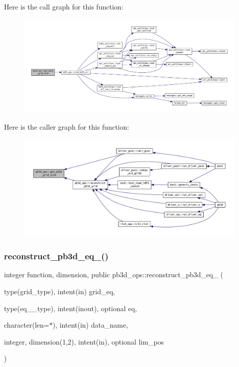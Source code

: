 Here is the call graph for this function\+:
\nopagebreak
\begin{figure}[H]
\begin{center}
\leavevmode
\includegraphics[width=350pt]{namespacepb3d__ops_a0bd4c4c24d7cbd1494b31ea993946433_cgraph}
\end{center}
\end{figure}
Here is the caller graph for this function\+:
\nopagebreak
\begin{figure}[H]
\begin{center}
\leavevmode
\includegraphics[width=350pt]{namespacepb3d__ops_a0bd4c4c24d7cbd1494b31ea993946433_icgraph}
\end{center}
\end{figure}
\mbox{\label{namespacepb3d__ops_a248d51dc98b7de287499ba3a4e6c1eaa}} 
\subsubsection{\texorpdfstring{reconstruct\+\_\+pb3d\+\_\+eq\+\_()}{reconstruct\_pb3d\_eq\_1()}}
{\footnotesize\ttfamily integer function, dimension, public pb3d\+\_\+ops\+::reconstruct\+\_\+pb3d\+\_\+eq\+\_ (\begin{DoxyParamCaption}\item[{type(grid\+\_\+type), intent(in)}]{grid\+\_\+eq,  }\item[{type(eq\+\_\+1\+\_\+type), intent(inout), optional}]{eq,  }\item[{character(len=$\ast$), intent(in)}]{data\+\_\+name,  }\item[{integer, dimension(1,2), intent(in), optional}]{lim\+\_\+pos }\end{DoxyParamCaption})}



